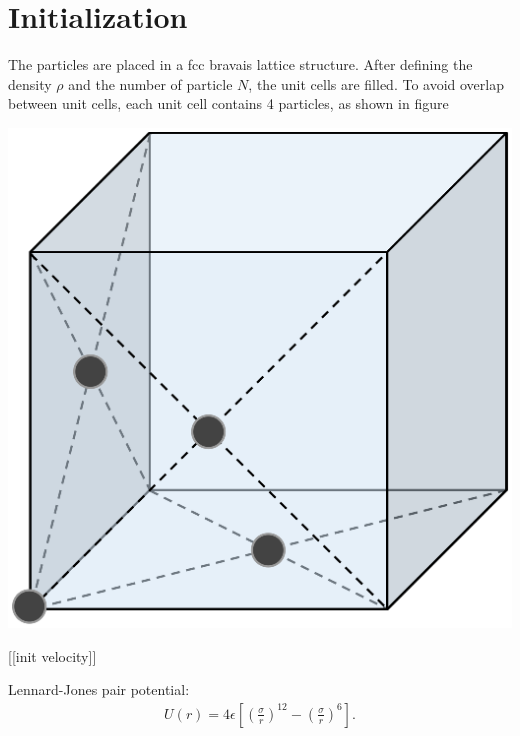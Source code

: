 \section{Initialization}
The particles are placed in a fcc bravais lattice structure. After defining the density $\rho$ and the number of particle $N$, the unit cells are filled. To avoid overlap between unit cells, each unit cell contains 4 particles, as shown in figure %



\begin{Figure}
 \centering
 \includegraphics[width=0.5\linewidth]{fcc_cell.eps}
\end{Figure}
[[init velocity]]

Lennard-Jones pair potential:
\begin{gather*} 
    U(r) = 4\epsilon\left[\left(\frac{\sigma}{r}\right)^{12}-\left(\frac{\sigma}{r}\right)^6\right].
\end{gather*}